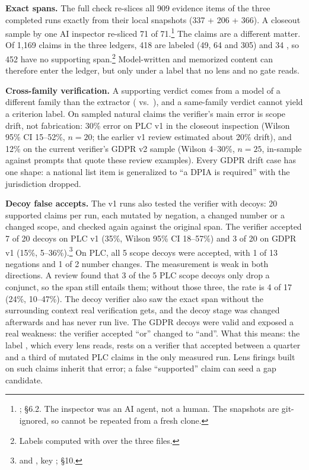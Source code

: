\textbf{Exact spans.} \evobs{} The full check  re-slices all 909
evidence items of the three completed runs exactly from their local snapshots (337 + 206 + 366). A
closeout sample by one AI inspector re-sliced 71 of 71.\footnote{;
 \S6.2. The inspector was an AI agent, not a human. The snapshots
are git-ignored, so  cannot be repeated from a fresh clone.} The claims are a
different matter. Of 1,169 claims in the three ledgers, 418 are labeled
 (49, 64 and 305) and 34 , so 452 have no supporting
span.\footnote{Labels computed with  over the three 
files.} Model-written and memorized content can therefore enter the ledger, but only under a label
that no lens and no gate reads.

\textbf{Cross-family verification.} \evobs{} A supporting verdict comes from a model of a different
family than the extractor ( vs.\ ), and a
same-family verdict cannot yield a criterion label. On sampled natural claims the verifier's main
error is scope drift, not fabrication: 30\% error on PLC v1 in the closeout inspection (Wilson 95\%
CI 15--52\%, $n=20$; the earlier v1 review estimated about 20\% drift), and 12\% on the current
verifier's GDPR v2 sample (Wilson 4--30\%, $n=25$, in-sample against prompts that quote these review
examples). Every GDPR drift case has one shape: a national list item is generalized to \enquote{a
DPIA is required} with the jurisdiction dropped.

\textbf{Decoy false accepts.} \evobs{} The v1 runs also tested the verifier with decoys: 20
supported claims per run, each mutated by negation, a changed number or a changed scope, and checked
again against the original span. The verifier accepted 7 of 20 decoys on PLC v1 (35\%, Wilson 95\% CI
18--57\%) and 3 of 20 on GDPR v1 (15\%, 5--36\%).\footnote{
and , key ;
 \S10.} On PLC, all 5 scope decoys were accepted, with 1 of
13 negations and 1 of 2 number changes. The measurement is weak in both directions. A review found
that 3 of the 5 PLC scope decoys only drop a conjunct, so the span still entails them; without those
three, the rate is 4 of 17 (24\%, 10--47\%). The decoy verifier also saw the exact span without the
surrounding context real verification gets, and the decoy stage was changed afterwards and has never
run live. The GDPR decoys were valid and exposed a real weakness: the verifier accepted
\enquote{or} changed to \enquote{and}. \evint{} What this means: the label
, which every lens reads, rests on a verifier that accepted between a
quarter and a third of mutated PLC claims in the only measured run. Lens firings built on such claims
inherit that error; a false \enquote{supported} claim can seed a gap candidate.


